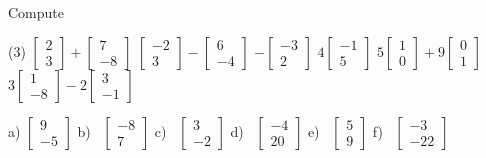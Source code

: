 \begin{exercise}
Compute
\begin{tasks}(3)
\task
$\begin{bmatrix}
2 \\
3 
\end{bmatrix}
+
\begin{bmatrix}
7 \\
-8
\end{bmatrix}
$
\task
$\begin{bmatrix}
-2 \\
3 
\end{bmatrix}
-
\begin{bmatrix}
6 \\
-4
\end{bmatrix}
$
\task
$
-\begin{bmatrix}
-3 \\
2 
\end{bmatrix}
$
\task
$
4\begin{bmatrix}
-1 \\
5 
\end{bmatrix}
$
\task
$
5\begin{bmatrix}
1 \\
0 
\end{bmatrix}
+
9
\begin{bmatrix}
0 \\
1
\end{bmatrix}
$
\task
$
3\begin{bmatrix}
1 \\
-8 
\end{bmatrix}
-
2
\begin{bmatrix}
3 \\
-1
\end{bmatrix}
$
\end{tasks}
\end{exercise}
\comboSol{%
}
{%
a) $\left[\begin{smallmatrix} 9 \\ -5 \end{smallmatrix}\right]$ \quad b)~ $\left[\begin{smallmatrix}  -8 \\ 7 \end{smallmatrix}\right]$ \quad c)~ $\left[\begin{smallmatrix} 3 \\ -2 \end{smallmatrix}\right]$ \quad
d)~ $\left[\begin{smallmatrix} -4 \\ 20 \end{smallmatrix}\right]$ \quad e)~ $\left[\begin{smallmatrix} 5 \\ 9 \end{smallmatrix}\right]$ \quad f)~ $\left[\begin{smallmatrix} -3 \\ -22 \end{smallmatrix}\right]$
}

